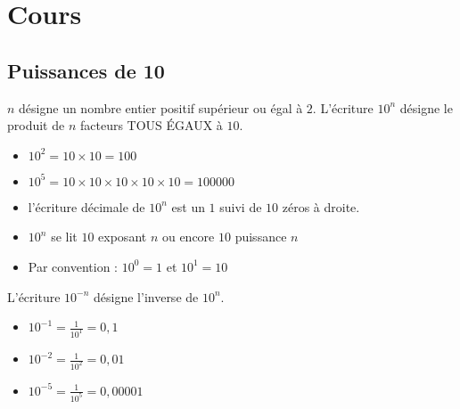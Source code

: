 \documentclass[10pt]{article}
\begin{document}
{\setlength{\baselineskip}{1.5\baselineskip}

\section{Cours}
\subsection{Puissances de 10}

\begin{Def} 
$n$ désigne un nombre entier positif supérieur ou égal à $2$.	 L'écriture $10^n$ désigne le produit de $n$ facteurs TOUS ÉGAUX à $10$.
\end{Def}
	   
\begin{Ex} 	
\begin{itemize}
\item $10^2= 10\times 10=100$
\item $10^5= 10\times 10\times 10\times 10\times 10= 100 000$		   
\end{itemize}
\end{Ex}

\begin{Rq}
\begin{itemize}
\item l'écriture décimale de $10^n$ est un $1$ suivi de $10$ \og zéros \fg{} à droite.
\item $10^n$ se lit $10$ \og exposant \fg{} $n$ ou encore $10$ \og puissance \fg{} $n$
\item Par convention : $10^0= 1$ et 		$10^1=10$
\end{itemize}	 
\end{Rq}
 
\begin{Def}
L'écriture $10^{-n}$ désigne l'inverse de $10^n$.
\end{Def}

	   
\begin{Ex}
\begin{itemize}
\item	$10^{-1}=\frac{1}{10^1} = 0,1$		
\item $10^{-2}=\frac{1}{10^2}  = 0,01$
\item $10^{-5}=\frac{1}{10^5} =  0,000 01$
\end{itemize}
\end{Ex}

}
\end{document}
